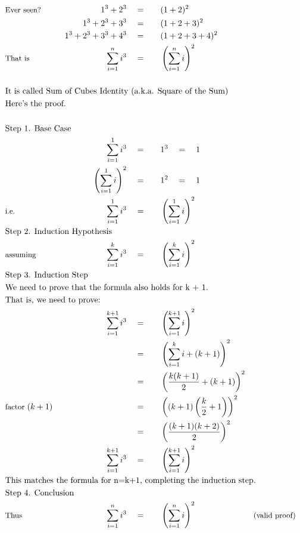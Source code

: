 \begin{alignat*}{5}
&\small\text{Ever seen?}\qquad&1^3+2^3\quad&=\quad&&(1+2)^2\\
&\,&1^3+2^3+3^3\quad&=&&(1+2+3)^2\\
&\,&1^3+2^3+3^3+4^3\quad&=&&(1+2+3+4)^2\\
&\small\text{That is}&\sum_{i=1}^{n}i^3\quad&=&&\left(\sum_{i=1}^{n}i\right)^2\\ \\
&\rlap{\text{It is called Sum of Cubes Identity (a.k.a. Square of the Sum)}}\\
&\rlap{\text{Here's the proof.}}\\ \\
&\rlap{\text{Step 1. Base Case}}\\
&\,&\sum_{i=1}^{1}i^3\quad&=&&1^3\quad=\quad1\\
&\,&\left(\sum_{i=1}^{1}i\right)^2\quad&=&&1^2\quad=\quad1\\
&\small\text{i.e.}&\sum_{i=1}^{1}i^3\quad&=&&\left(\sum_{i=1}^{1}i\right)^2\\
&\rlap{\text{Step 2. Induction Hypothesis}}\\
&\small\text{assuming}&\sum_{i=1}^{k}i^3\quad&=&&\left(\sum_{i=1}^{k}i\right)^2\\
&\rlap{\text{Step 3. Induction Step}}\\
&\rlap{\text{We need to prove that the formula also holds for k + 1.}}\\
&\rlap{\text{That is, we need to prove:}}\\
&\,&\sum_{i=1}^{k+1}i^3\quad&=&&\left(\sum_{i=1}^{k+1}i\right)^2\\
&\,&\,&=&&\left(\sum_{i=1}^{k}i+(k+1)\right)^2\\
&\,&\,&=&&\left(\frac{k(k+1)}{2}+(k+1)\right)^2\\
&\small\text{factor }(k+1)&\,&=&&\left((k+1)\left(\frac{k}{2}+1\right)\right)^2\\
&\,&\,&=&&\left(\frac{(k+1)(k+2)}{2}\right)^2\\
&\,&\sum_{i=1}^{k+1}i^3\quad&=&&\left(\sum_{i=1}^{k+1}i\right)^2\\
&\rlap{\text{This matches the formula for }n=k+1\text{, completing the induction step.}}\\
&\rlap{\text{Step 4. Conclusion}}\\
&\small\text{Thus}&\sum_{i=1}^{n}i^3\quad&=&&\left(\sum_{i=1}^{n}i\right)^2\qquad&&\small\text{(valid proof)}\\
\end{alignat*}
